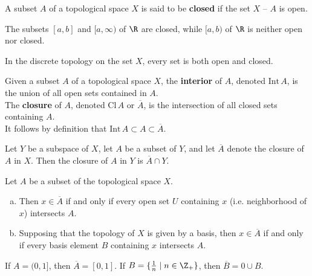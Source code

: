 \begin{definition}
A subset $A$ of a topological space $X$ is said to be \textbf{closed} if the set $X \text{ -- } A$ is open. 
\end{definition}

\begin{eg}
The subsets $[a, b]$ and $[a, \infty)$ of $\R$ are closed, while $[a, b)$ of $\R$ is neither open nor closed.
\end{eg}

\begin{eg}
In the discrete topology on the set $X$, every set is both open and closed.
\end{eg}

\begin{definition}
Given a subset $A$ of a topological space $X$, the \textbf{interior} of $A$, denoted $\mathrm{Int} \, A$, is the union of all open sets contained in $A$. \\

The \textbf{closure} of $A$, denoted $\mathrm{Cl} \, A$ or $\overline{A}$, is the intersection of all closed sets containing $A$. \\

It follows by definition that $\mathrm{Int} \, A \subset A \subset \overline{A}$.  
\end{definition}

\begin{theorem}
Let $Y$ be a subspace of $X$, let $A$ be a subset of $Y$, and let $\overline{A}$ denote the closure of $A$ in $X$. Then the closure of $A$ in $Y$ is $\overline{A} \cap Y$.  
\end{theorem}

\begin{theorem}
Let $A$ be a subset of the topological space $X$. 
\begin{enumerate}[a)]
    \item Then $x \in \overline{A}$ if and only if every open set $U$ containing $x$ (i.e. neighborhood of $x$) intersects $A$.
    \item Supposing that the topology of $X$ is given by a basis, then $x \in \overline{A}$ if and only if every
    basis element $B$ containing $x$ intersects $A$.
\end{enumerate}    
\end{theorem}

\begin{eg}
If $A = (0, 1]$, then $\overline{A} = [0, 1]$. If $B = \{ \frac{1}{n} \mid n \in \Z_+ \} $, then $\overline{B} = 0 \cup B$.
\end{eg}

